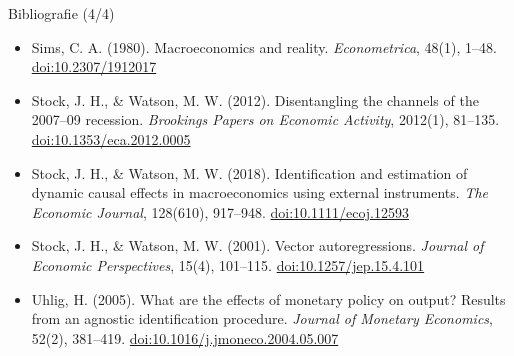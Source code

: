 \begin{frame}{Bibliografie (4/4)}
\begin{itemize}
    \item Sims, C. A. (1980). Macroeconomics and reality. \textit{Econometrica}, 48(1), 1--48. \href{https://doi.org/10.2307/1912017}{doi:10.2307/1912017}
    \item Stock, J. H., \& Watson, M. W. (2012). Disentangling the channels of the 2007--09 recession. \textit{Brookings Papers on Economic Activity}, 2012(1), 81--135. \href{https://doi.org/10.1353/eca.2012.0005}{doi:10.1353/eca.2012.0005}
    \item Stock, J. H., \& Watson, M. W. (2018). Identification and estimation of dynamic causal effects in macroeconomics using external instruments. \textit{The Economic Journal}, 128(610), 917--948. \href{https://doi.org/10.1111/ecoj.12593}{doi:10.1111/ecoj.12593}
    \item Stock, J. H., \& Watson, M. W. (2001). Vector autoregressions. \textit{Journal of Economic Perspectives}, 15(4), 101--115. \href{https://doi.org/10.1257/jep.15.4.101}{doi:10.1257/jep.15.4.101}
    \item Uhlig, H. (2005). What are the effects of monetary policy on output? Results from an agnostic identification procedure. \textit{Journal of Monetary Economics}, 52(2), 381--419. \href{https://doi.org/10.1016/j.jmoneco.2004.05.007}{doi:10.1016/j.jmoneco.2004.05.007}
\end{itemize}
\end{frame}


